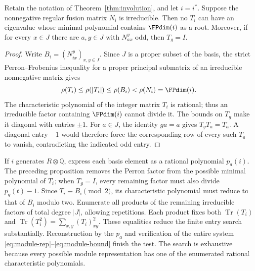 \begin{proposition}\label{prop:module-perron}
Retain the notation of Theorem~\ref{thm:involution}, and let $i=i^*$.
Suppose the nonnegative regular fusion matrix $N_i$ is irreducible.
Then no $T_i$ can have an eigenvalue whose minimal polynomial contains
$\FPdim(i)$ as a root. Moreover, if for every $x\in J$ there are
$a,y\in J$ with $N_{ax}^{y}$ odd, then $T_g=I$.
\end{proposition}
\begin{proof}
Write $B_i=(N_{ix}^{y})_{x,y\in J}$. Since $J$ is a proper subset of
the basis, the strict Perron--Frobenius inequality for a proper principal
submatrix of an irreducible nonnegative matrix gives
\[
 \rho(T_i)\leq\rho(|T_i|)\leq\rho(B_i)<\rho(N_i)=\FPdim(i).
\]
The characteristic polynomial of the integer matrix $T_i$ is rational;
thus an irreducible factor containing $\FPdim(i)$ cannot divide it.
The bounds on $T_g$ make it diagonal with entries $\pm1$.
For $a\in J$, the identity $ga=a$ gives $T_gT_a=T_a$.
A diagonal entry $-1$ would therefore force the corresponding row of
every such $T_a$ to vanish, contradicting the indicated odd entry.
\end{proof}

If $i$ generates $R\otimes\mathbb Q$, express each basis element as a
rational polynomial $p_a(i)$. The preceding proposition removes the
Perron factor from the possible minimal polynomial of $T_i$; when
$T_g=I$, every remaining factor must also divide $p_g(t)-1$.
Since $T_i\equiv B_i\pmod2$, its characteristic polynomial must reduce
to that of $B_i$ modulo two. Enumerate all products of the remaining
irreducible factors of total degree $|J|$, allowing repetitions. Each
product fixes both $\operatorname{Tr}(T_i)$ and
$\operatorname{Tr}(T_i^2)=\sum_{x,y}(T_i)_{xy}^2$.
These equalities reduce the finite entry search substantially.
Reconstruction by the $p_a$ and verification of the entire system
\eqref{eq:module-rep}--\eqref{eq:module-bound} finish the test.
The search is exhaustive because every possible module representation
has one of the enumerated rational characteristic polynomials.

